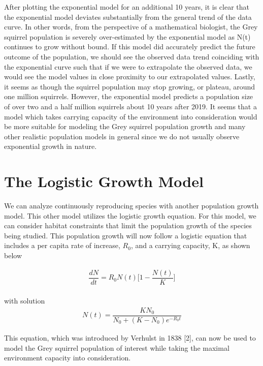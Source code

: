 \documentclass[12pt]{article}
\begin{document}
After plotting the exponential model for an additional 10 years, it is clear that the exponential model deviates substantially from the general trend of the data curve. In other words, from the perspective of a mathematical biologist, the Grey squirrel population is severely over-estimated by the exponential model as N(t) continues to grow without bound. If this model did accurately predict the future outcome of the population, we should see the observed data trend coinciding with the exponential curve such that if we were to extrapolate the observed data, we would see the model values in close proximity to our extrapolated values. Lastly, it seems as though the squirrel population may stop growing, or plateau, around one million squirrels. However, the exponential model predicts a population size of over two and a half million squirrels about 10 years after 2019. It seems that a model which takes carrying capacity of the environment into consideration would be more suitable for modeling the Grey squirrel population growth and many other realistic population models in general since we do not usually observe exponential growth in nature.
 
\section{The Logistic Growth Model}
We can analyze continuously reproducing species with another population growth model. This other model utilizes the logistic growth equation. For this model, we can consider habitat constraints that limit the population growth of the species being studied. This population growth will now follow a logistic equation that includes a per capita rate of increase, $R_0$, and a carrying capacity, K, as shown below\

\begin{gather*}
\dfrac{dN}{dt} = R_0N(t)\Big[1 - \dfrac{N(t)}{K}\Big] 
\end{gather*}\\

with solution 
\begin{gather*}
N(t) = \dfrac{KN_0}{N_0+(K-N_0)e^{-R_0t}}
\end{gather*}

This equation, which was introduced by Verhulst in 1838 [2], can now be used to model the Grey squirrel population of interest while taking the maximal environment capacity into consideration.

\end{document}
